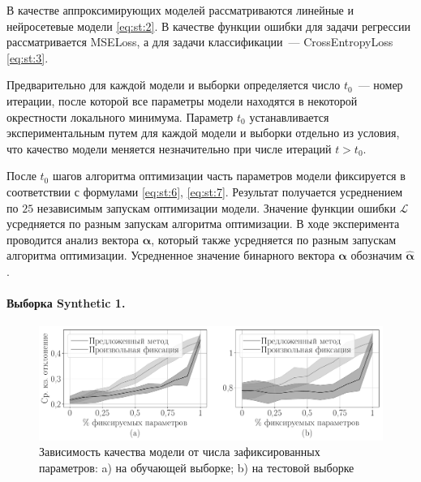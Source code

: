 В качестве аппроксимирующих моделей рассматриваются линейные и нейросетевые модели \eqref{eq:st:2}. В качестве функции ошибки для задачи регрессии рассматривается MSELoss, а для задачи классификации~--- CrossEntropyLoss \eqref{eq:st:3}.

Предварительно для каждой модели и выборки определяется число $t_0$~--- номер итерации, после которой все параметры модели находятся в некоторой окрестности локального минимума. Параметр $t_0$ устанавливается экспериментальным путем для каждой модели и выборки отдельно из условия, что качество модели меняется незначительно при числе итераций $t>t_0$.

После $t_0$ шагов алгоритма оптимизации часть параметров модели фиксируется в соответствии с формулами \eqref{eq:st:6}, \eqref{eq:st:7}. Результат получается усреднением по $25$ независимым запускам оптимизации модели. Значение функции ошибки $\mathcal{L}$ усредняется по разным запускам алгоритма оптимизации. В ходе эксперимента проводится анализ вектора $\bm{\alpha}$, который также усредняется по разным запускам алгоритма оптимизации. Усредненное значение бинарного вектора  $\bm{\alpha}$ обозначим $\hat{\bm{\alpha}}$.

\paragraph{Выборка Synthetic 1.}

\begin{figure}[h!t]\center
\includegraphics[width=1\textwidth]{results/order/generate_data_neural_loss}
\caption{Зависимость качества модели от числа зафиксированных параметров: a) на обучающей выборке; b) на тестовой выборке}
\label{fg:ex:syn3:1}
\end{figure}


